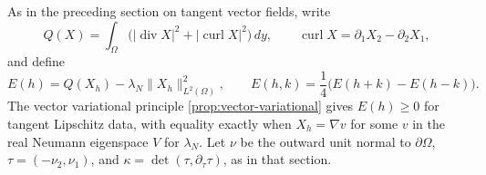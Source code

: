 As in the preceding section on tangent vector fields, write
\[
 Q(X)=\int_\Omega\bigl(|\operatorname{div}X|^2
                         +|\operatorname{curl}X|^2\bigr)\,dy,
 \qquad \operatorname{curl}X=\partial_1X_2-\partial_2X_1,
\]
and define
\[
 E(h)=Q(X_h)-\lambda_N\|X_h\|_{L^2(\Omega)}^2,
 \qquad E(h,k)=\frac14\bigl(E(h+k)-E(h-k)\bigr).
\]
The vector variational principle \cref{prop:vector-variational}
gives $E(h)\ge0$ for tangent
Lipschitz data, with equality exactly when $X_h=\nabla v$ for some
$v$ in the real Neumann eigenspace $V$ for $\lambda_N$.
Let $\nu$ be the outward unit normal to $\partial\Omega$,
$\tau=(-\nu_2,\nu_1)$, and
$\kappa=\det(\tau,\partial_\tau\tau)$, as in that section.

